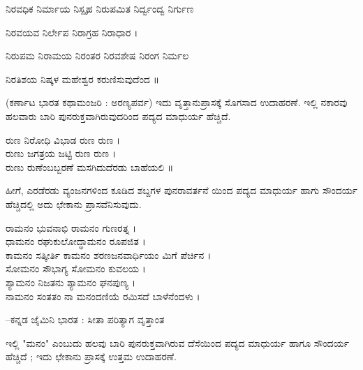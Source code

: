 \noindent\hspace*{1.2em}\hspace{0.6em}ನಿರವಧಿಕ ನಿರ್ಮಾಯ ನಿಸ್ಪೃಹ ನಿರುಪಮಿತ ನಿರ್ದ್ವಂದ್ವ ನಿರ್ಗುಣ\par

\begin{kbvverse}
\noindent ನಿರವಯವ ನಿರ್ಲೇಪ ನಿರಾಗ್ರಹ ನಿರಾಧಾರ ।
\end{kbvverse}

\indent ನಿರುಪಮ ನಿರಾಮಯ ನಿರಂತರ ನಿರವಶೇಷ ನಿರಂಗ ನಿರ್ಮಲ\par

\begin{kbvverse}
\noindent ನಿರತಿಶಯ ನಿಷ್ಕಳ ಮಹೇಶ್ವರ ಕರುಣಿಸುವುದೆಂದ ॥
\end{kbvverse}

\indent (ಕರ್ಣಾಟ ಭಾರತ ಕಥಾಮಂಜರಿ : ಅರಣ್ಯಪರ್ವ) ಇದು ವೃತ್ತಾನುಪ್ರಾಸಕ್ಕೆ ಸೊಗಸಾದ ಉದಾಹರಣೆ. ಇಲ್ಲಿ ನಕಾರವು ಹಲವಾರು ಬಾರಿ ಪುನರುಕ್ತವಾಗಿರುವುದರಿಂದ ಪದ್ಯದ ಮಾಧುರ್ಯ ಹೆಚ್ಚಿದೆ.\par


\begin{kbvverse}
\noindent ರುಣ ನಿರೋಧಿ ವಿಭಾಡ ರುಣ ರುಣ । \\
\noindent ರುಣು ಜಗತ್ರಯ ಜಟ್ಟಿ ರುಣ ರುಣ । \\
\noindent ರುಣು ರುಣೆಂಬಬ್ಬರಣೆ ಮಸಗಿದುದೆರಡು ಬಾಹೆಯಲಿ ॥
\end{kbvverse}

\indent ಹೀಗೆ, ಎರಡೆರಡು ವ್ಯಂಜನಗಳಿಂದ ಕೂಡಿದ ಶಬ್ದಗಳ ಪುನರಾವರ್ತನೆ ಯಿಂದ ಪದ್ಯದ ಮಾಧುರ್ಯ ಹಾಗು ಸೌಂದರ್ಯ ಹೆಚ್ಚಿದಲ್ಲಿ ಅದು ಛೇಕಾನು ಪ್ರಾಸವೆನಿಸುವುದು.\par

\vspace{3pt plus 2pt}\noindent\hspace*{1.2em}\par\vspace{1pt}

\begin{kbvverse}
\noindent ರಾಮನಂ ಭುವನಾಭಿ ರಾಮನಂ ಗುಣರತ್ನ । \\
\noindent ಧಾಮನಂ ರಘುಕುಲೋದ್ಧಾಮನಂ ರೂಪಜಿತ । \\
\noindent ಕಾಮನಂ ಸತ್ಕೀರ್ತಿ ಕಾಮನಂ ಶರಣಜನವಾರ್ಧಿಯಂ ಮಿಗೆ ಪೆರ್ಚಿನ । \\
\noindent ಸೋಮನಂ ಸೌಭಾಗ್ಯ ಸೋಮನಂ ಕುವಲಯ । \\
\noindent ಶ್ಯಾಮನಂ ನಿಜತನು ಶ್ಯಾಮನಂ ಘನಪುಣ್ಯ । \\
\noindent ನಾಮನಂ ಸಂತತಂ ನಾ ಮನಂದಣಿಯೆ ರಮಿಸದೆ ಬಾಳೆನೆಂದಳು ।
\end{kbvverse}

\noindent\hfill{\fontsize{9.5pt}{12.5pt}\selectfont\color{kbvgrey}--ಕನ್ನಡ ಜೈಮಿನಿ ಭಾರತ : ಸೀತಾ ಪರಿತ್ಯಾಗ ವೃತ್ತಾಂತ}\par\vspace{3pt plus 2pt}

\indent ಇಲ್ಲಿ "ಮನಂ" ಎಂಬುದು ಹಲವು ಬಾರಿ ಪುನರುಕ್ತವಾಗಿರುವ ದೆಸೆಯಿಂದ ಪದ್ಯದ ಮಾಧುರ್ಯ ಹಾಗೂ ಸೌಂದರ್ಯ ಹೆಚ್ಚಿದೆ ; ಇದು ಛೇಕಾನು ಪ್ರಾಸಕ್ಕೆ ಉತ್ತಮ ಉದಾಹರಣೆ.\par
